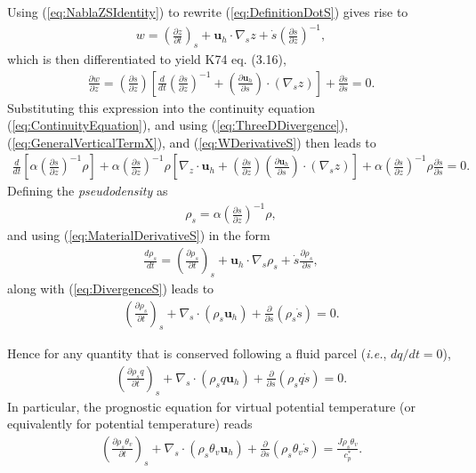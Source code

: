 \documentclass[gmd, manuscript]{copernicus}
\newcommand{\vb}{\mathbf}
\newcommand{\diff}[2]{\frac{d #1}{d #2}}
\newcommand{\pdiff}[2]{\frac{\partial #1}{\partial #2}}
\begin{document}
Using (\ref{eq:NablaZSIdentity}) to rewrite (\ref{eq:DefinitionDotS}) gives rise to
\begin{align}
w = \left( \pdiff{z}{t} \right)_s + \vb{u}_h \cdot \nabla_s z + \dot{s} \left( \pdiff{s}{z} \right)^{-1},
\end{align} which is then differentiated to yield K74 eq. (3.16),
\begin{align} \label{eq:WDerivativeS}
\pdiff{w}{z} = \left( \pdiff{s}{z} \right) \left[ \diff{}{t} \left( \pdiff{s}{z} \right)^{-1} + \left( \pdiff{\vb{u}_h}{s} \right) \cdot (\nabla_s z) \right] + \pdiff{\dot{s}}{s} = 0.
\end{align}  Substituting this expression into the continuity equation (\ref{eq:ContinuityEquation}), and using (\ref{eq:ThreeDDivergence}), (\ref{eq:GeneralVerticalTermX}), and (\ref{eq:WDerivativeS}) then leads to
\begin{align}
\diff{}{t} \left[ \alpha \left( \pdiff{s}{z} \right)^{-1} \rho \right] + \alpha \left( \pdiff{s}{z} \right)^{-1} \rho \left[ \nabla_z \cdot \vb{u}_h + \left( \pdiff{s}{z} \right) \left( \pdiff{\vb{u}_h}{s} \right) \cdot (\nabla_s z) \right] + \alpha \left( \pdiff{s}{z} \right)^{-1} \rho \pdiff{\dot{s}}{s} = 0.
\end{align}  Defining the \textit{pseudodensity} as 
\begin{align}
\rho_s = \alpha \left( \pdiff{s}{z} \right)^{-1} \rho,
\end{align} and using (\ref{eq:MaterialDerivativeS}) in the form
\begin{align}
\diff{\rho_s}{t} = \left( \pdiff{\rho_s}{t} \right)_s + \vb{u}_h \cdot \nabla_s \rho_s + \dot{s} \pdiff{\rho_s}{s},
\end{align} along with (\ref{eq:DivergenceS}) leads to
\begin{align} \label{eq:PrognosticPseudoDensity}
\left( \pdiff{\rho_s}{t} \right)_s + \nabla_s \cdot (\rho_s \vb{u}_h) + \pdiff{}{s} (\rho_s \dot{s}) = 0.
\end{align}

Hence for any quantity that is conserved following a fluid parcel (\textit{i.e.}, $dq/dt = 0$),
\begin{align}
\left( \pdiff{\rho_s q}{t} \right)_s + \nabla_s \cdot (\rho_s q \vb{u}_h) + \pdiff{}{s} (\rho_s q \dot{s}) = 0.
\end{align}  In particular, the prognostic equation for virtual potential temperature (or equivalently for potential temperature) reads
\begin{align} \label{eq:PrognosticPseudoDensityTheta}
\left( \pdiff{\rho_s \theta_v}{t} \right)_s + \nabla_s \cdot (\rho_s \theta_v \vb{u}_h) + \pdiff{}{s} (\rho_s \theta_v \dot{s}) = \frac{J \rho_s \theta_v}{c_p^\ast}.
\end{align}
\end{document}
